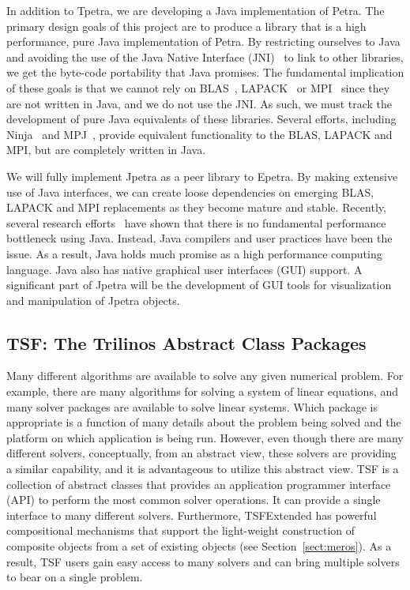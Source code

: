 \documentclass[acmtoms,acmnow]{acmtrans2m}
\begin{document}
In addition to Tpetra, we are developing a Java implementation of Petra.  
The primary design goals of this project are to produce a library that 
is a high performance, pure Java implementation of Petra.  By restricting 
ourselves to Java and avoiding the use of the Java Native Interface 
(JNI)~\cite{JNI-site} to link to other libraries, we get the byte-code 
portability that Java promises.  The fundamental implication of these 
goals is that we cannot rely on BLAS~\cite{BLAS1,BLAS2,BLAS3}, 
LAPACK~\cite{lapack} or MPI~\cite{MPI} since they are not written in 
Java, and we do not use the JNI.  As such, we must track the development 
of pure Java equivalents of these libraries.  Several efforts, including 
Ninja~\cite{MoreMidkGuptArtiWuAlma2001} and 
MPJ~\cite{CarpGetoJuddSkjeFox2000}, provide equivalent functionality 
to the BLAS, LAPACK and MPI, but are completely written in Java.

We will fully implement Jpetra as a peer library to Epetra.  By making 
extensive use of Java interfaces, we can create loose dependencies on 
emerging BLAS, LAPACK and MPI replacements as they become mature and 
stable.  Recently, several research 
efforts~\cite{MoreMidkGuptArtiWuAlma2001,SCIMARK-site} have shown 
that there is no fundamental performance bottleneck using Java.  
Instead, Java compilers and user practices have been the issue.  
As a result, Java holds much promise as a high performance computing 
language.  Java also has native graphical user 
interfaces (GUI) support.  A significant part of Jpetra will be 
the development of GUI tools for visualization and manipulation of 
Jpetra objects.


\subsection{TSF: The Trilinos Abstract Class Packages}

Many different algorithms are available to solve any given numerical
problem.  For example, there are many algorithms for solving a system
of linear equations, and many solver packages are available to solve
linear systems.  Which package is appropriate is a function of
many details about the problem being solved and the platform on which
application is being run. However, even though
there are many different solvers, conceptually, from an abstract view,
these solvers are providing a similar capability, and it is
advantageous to utilize this abstract view.
TSF is a collection of abstract classes that provides an application
programmer interface (API) to perform the most common solver
operations.  It can provide a single interface to many different
solvers.  Furthermore, TSFExtended has powerful compositional
mechanisms that support the
light-weight construction of composite objects from a set of
existing objects (see Section~\ref{sect:meros}).
As a result, TSF users gain easy access to many
solvers and can bring multiple solvers to bear on a single problem.
\end{document}
